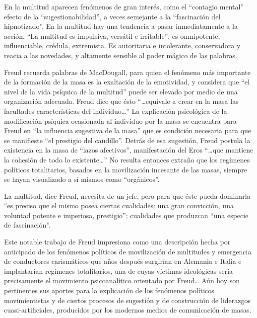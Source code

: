 \documentclass[
]{book}
\begin{document}
En la multitud aparecen fenómenos de gran interés, como el ``contagio mental'' efecto de la ``sugestionabilidad'', a veces semejante a la ``fascinación del hipnotizado''. En la multitud hay una tendencia a pasar inmediatamente a la acción. ``La multitud es impulsiva, versátil e irritable''; es omnipotente, influenciable, crédula, extremista. Es autoritaria e intolerante, conservadora y reacia a las novedades, y altamente sensible al poder mágico de las palabras.

Freud recuerda palabras de MacDougall, para quien el fenómeno más importante de la formación de la masa es la exaltación de la emotividad, y considera que ``el nivel de la vida psíquica de la multitud'' puede ser elevado por medio de una organización adecuada. Freud dice que ésto ``\ldots equivale a crear en la masa las facultades características del individuo\ldots{}'' La explicación psicológica de la modificación psíquica ocasionada al individuo por la masa se encuentra para Freud en ``la influencia sugestiva de la masa'' que es condición necesaria para que se manifieste ``el prestigio del caudillo''. Detrás de esa sugestión, Freud postula la existencia en la masa de ``lazos afectivos'', manifestación del Eros ``\ldots que mantiene la cohesión de todo lo existente\ldots{}'' No resulta entonces extraño que los regímenes políticos totalitarios, basados en la movilización incesante de las masas, siempre se hayan visualizado a sí mismos como ``orgánicos''.

La multitud, dice Freud, necesita de un jefe, pero para que éste pueda dominarla ``es preciso que el mismo posea ciertas cualidades: una gran convicción, una voluntad potente e imperiosa, prestigio''; cualidades que produzcan ``una especie de fascinación''.

Este notable trabajo de Freud impresiona como una descripción hecha por anticipado de los fenómenos políticos de movilización de multitudes y emergencia de conductores carismáticos que años después surgirían en Alemania e Italia e implantarían regímenes totalitarios, una de cuyas víctimas ideológicas sería precisamente el movimiento psicoanalítico orientado por Freud\ldots{} Aún hoy son pertinentes sus aportes para la explicación de los fenómenos políticos movimientistas y de ciertos procesos de sugestión y de construcción de liderazgos cuasi-artificiales, producidos por los modernos medios de comunicación de masas.
\end{document}
